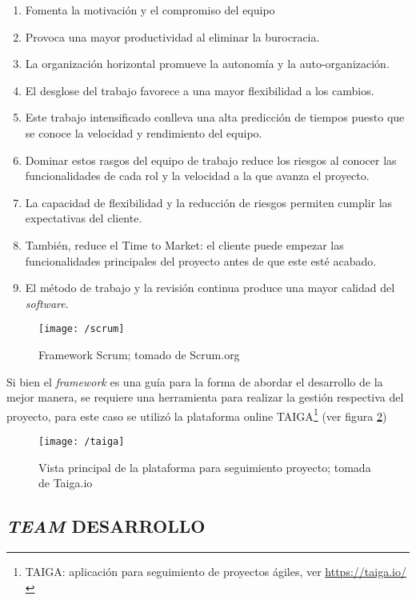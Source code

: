 \begin{enumerate}[1.]
    \item Fomenta la motivación y el compromiso del equipo 
    \item Provoca una mayor productividad al eliminar la burocracia.
    \item La organización horizontal promueve la autonomía y la auto-organización.
    \item El desglose del trabajo favorece a una mayor flexibilidad a los cambios. 
    \item Este trabajo intensificado conlleva una alta predicción de tiempos puesto que se conoce la velocidad y rendimiento del equipo.
    \item Dominar estos rasgos del equipo de trabajo reduce los riesgos al conocer las funcionalidades de cada rol y la velocidad a la que avanza el proyecto.
    \item La capacidad de flexibilidad y la reducción de riesgos permiten cumplir las expectativas del cliente.
    \item También, reduce el Time to Market: el cliente puede empezar las funcionalidades principales del proyecto antes de que este esté acabado.
    \item El método de trabajo y la revisión continua produce una mayor calidad del \textit{software}.

\end{enumerate}

\begin{figure}[h]
\centering
\texttt{[image: /scrum]}
\caption{Framework Scrum; tomado de Scrum.org} 
\label{img4-1}
\end{figure}

Si bien el \textit{framework} es una guía para la forma de abordar el desarrollo de la mejor manera, se requiere una herramienta para realizar la gestión respectiva del proyecto, para este caso se utilizó la plataforma online TAIGA\footnote{TAIGA: aplicación para seguimiento de proyectos ágiles, ver \url{https://taiga.io/}} (ver figura \ref{img4-2})

\begin{figure}[!h]
\centering
\texttt{[image: /taiga]}
\caption{Vista principal de la plataforma para seguimiento proyecto; tomada de Taiga.io} 
\label{img4-2}
\end{figure}

\subsection{\textit{TEAM} DESARROLLO}

